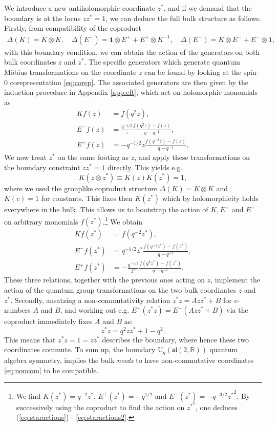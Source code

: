 \documentclass[a4paper,titlepage,12pt]{article}
\numberwithin{equation}{section}
\begin{document}
We introduce a new antiholomorphic coordinate $z^*$, and if we demand that the boundary is at the locus $zz^*=1$, we can deduce the full bulk structure as follows. Firstly, from compatibility of the coproduct 
\begin{gather}
    \Delta(K) = K \otimes K, \quad \Delta(E^+) = \mathbf{1} \otimes E^+ + E^+ \otimes K^{-1}, \quad
    \Delta(E^-) =  K \otimes E^- + E^- \otimes \mathbf{1},
\end{gather}  
with this boundary condition, we can obtain the action of the generators on both bulk coordinates $z$ and $z^*$. The specific generators which generate quantum Möbius transformations on the coordinate $z$ can be found by looking at the spin-0 corepresentation  \eqref{eq:corep}. The associated generators are then given by the induction procedure in Appendix \ref{app:cft}, which act on holomorphic monomials as
\begin{align}
K f(z) &= f(q^2z), \\
E^- f(z) &= \frac{q^{-1/2}}{z}\frac{f(q^{2}z)-f(z)}{q-q^{-1}}, \\
E^+ f(z) &= -q^{-1/2}z \frac{f(q^{-2}z)-f(z)}{q-q^{-1}},
\end{align}
We now treat $z^*$ on the same footing as $z$, and apply these transformations on the boundary constraint $zz^*=1$ directly. This yields e.g.
\begin{equation}
K(z \otimes z^*) \equiv K(z)K(z^*)=1,
\end{equation}
where we used the grouplike coproduct structure $\Delta(K)=K\otimes K$ and $K(c) = 1$ for constants. This fixes then $K (z^*)$ which by holomorphicity holds everywhere in the bulk. This allows us to bootstrap the action of $K,E^+$ and $E^-$ on arbitrary monomials $f(z^*)$.\footnote{We find $K(z^*)=q^{-2}z^*$, $E^+(z^*)=-q^{1/2}$ and $E^-(z^*)=-q^{-3/2}{z^*}^2$. By successively using the coproduct to find the action on $z^{*^n}$, one deduces (\ref{eq:staractions}) - \eqref{eq:staractions2}.  } We obtain
\begin{align}
\label{eq:staractions}
K f(z^*) &= f(q^{-2} z^*), \\
E^- f(z^*) &= q^{-1/2}z^* \frac{f(q^{-2}z^*)-f(z^*)}{q-q^{-1}}, \\
\label{eq:staractions2}
E^+ f(z^*) &= -\frac{q^{-1/2}}{z^*} \frac{f(q^{2}z^*)-f(z^*)}{q-q^{-1}}.
\end{align}
These three relations, together with the previous ones acting on $z$, implement the action of the quantum group transformations on the two bulk coordinates $z$ and $z^*$. Secondly, ansatzing a non-commutativity relation $z^*z = Azz^* + B$ for $c$-numbers $A$ and $B$, and working out e.g. $E^-(z^*z) = E^-(Azz^*+ B)$ via the coproduct immediately fixes $A$ and $B$ as:
\begin{equation}
\label{eq:noncom}
 z^*z = q^2 zz^* + 1-q^2.
\end{equation}
This means that $z^*z=1=zz^*$ describes the boundary, where hence these two coordinates commute. To sum up, the boundary U$_q(\mathfrak{sl}(2,\mathbb{R}))$ quantum algebra symmetry, implies the bulk \emph{needs} to have non-commutative coordinates \eqref{eq:noncom} to be compatible.
\end{document}
